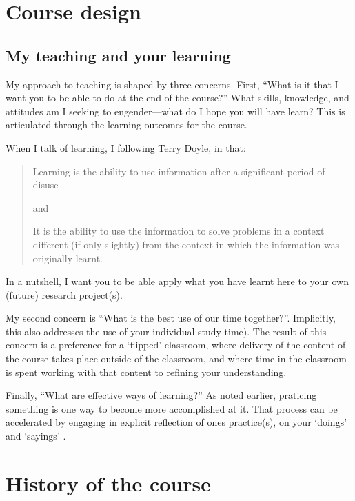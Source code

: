 \documentclass[]{book}
\theoremstyle{definition}
\theoremstyle{definition}
\theoremstyle{definition}
\theoremstyle{remark}
\begin{document}
\hypertarget{course-design}{%
\chapter{Course design}\label{course-design}}

\hypertarget{my-teaching-and-your-learning}{%
\section{My teaching and your
learning}\label{my-teaching-and-your-learning}}

My approach to teaching is shaped by three concerns. First, ``What is it
that I want you to be able to do at the end of the course?'' What
skills, knowledge, and attitudes am I seeking to engender---what do I
hope you will have learn? This is articulated through the learning
outcomes for the course.

When I talk of learning, I following Terry Doyle, in that:

\begin{quote}
Learning is the ability to use information after a significant period of
disuse

and

It is the ability to use the information to solve problems in a context
different (if only slightly) from the context in which the information
was originally learnt.
\end{quote}

In a nutshell, I want you to be able apply what you have learnt here to
your own (future) research project(s).

My second concern is ``What is the best use of our time together?''.
Implicitly, this also addresses the use of your individual study time).
The result of this concern is a preference for a `flipped' classroom,
where delivery of the content of the course takes place outside of the
classroom, and where time in the classroom is spent working with that
content to refining your understanding.

Finally, ``What are effective ways of learning?'' As noted earlier,
praticing something is one way to become more accomplished at it. That
process can be accelerated by engaging in explicit reflection of ones
practice(s), on your `doings' and `sayings'
\autocite{schatzki_2001_practiceturncontemporary}.

\hypertarget{history}{%
\chapter{History of the course}\label{history}}
\end{document}

